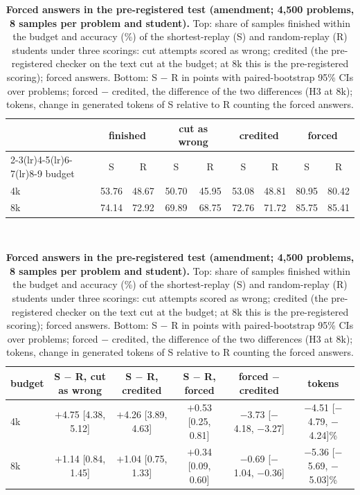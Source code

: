 \documentclass[10pt]{article}
\begin{document}
\begin{table}[h]
\centering\footnotesize
\caption{\textbf{Forced answers in the pre-registered test (amendment; 4{,}500 problems, 8 samples per problem and student).} Top: share of samples finished within the budget and accuracy (\%) of the shortest-replay (S) and random-replay (R) students under three scorings: cut attempts scored as wrong; credited (the pre-registered checker on the text cut at the budget; at 8k this is the pre-registered scoring); forced answers. Bottom: S $-$ R in points with paired-bootstrap 95\% CIs over problems; forced $-$ credited, the difference of the two differences (H3 at 8k); tokens, change in generated tokens of S relative to R counting the forced answers.}
\label{tab:amend}
\setlength{\tabcolsep}{4pt}
\begin{tabular}{lcccccccc}
\toprule
 & \multicolumn{2}{c}{finished} & \multicolumn{2}{c}{cut as wrong} & \multicolumn{2}{c}{credited} & \multicolumn{2}{c}{forced} \\
\cmidrule(lr){2-3}\cmidrule(lr){4-5}\cmidrule(lr){6-7}\cmidrule(lr){8-9}
budget & S & R & S & R & S & R & S & R \\
\midrule
4k & 53.76 & 48.67 & 50.70 & 45.95 & 53.08 & 48.81 & 80.95 & 80.42 \\
8k & 74.14 & 72.92 & 69.89 & 68.75 & 72.76 & 71.72 & 85.75 & 85.41 \\
\bottomrule
\end{tabular}\\[6pt]
\begin{tabular}{lccccc}
\toprule
budget & S $-$ R, cut as wrong & S $-$ R, credited & S $-$ R, forced & forced $-$ credited & tokens \\
\midrule
4k & $+$4.75 [4.38, 5.12] & $+$4.26 [3.89, 4.63] & $+$0.53 [0.25, 0.81] & $-$3.73 [$-$4.18, $-$3.27] & $-$4.51 [$-$4.79, $-$4.24]\% \\
8k & $+$1.14 [0.84, 1.45] & $+$1.04 [0.75, 1.33] & $+$0.34 [0.09, 0.60] & $-$0.69 [$-$1.04, $-$0.36] & $-$5.36 [$-$5.69, $-$5.03]\% \\
\bottomrule
\end{tabular}
\end{table}
\end{document}
